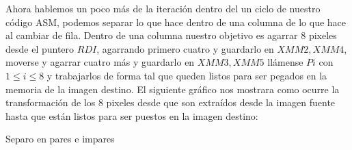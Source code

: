 Ahora hablemos un poco más de la iteración dentro del un ciclo de nuestro código ASM, podemos separar lo que hace dentro de una columna de lo que hace al cambiar de fila. Dentro de una columna nuestro objetivo es agarrar 8 pixeles desde el puntero $RDI$, agarrando primero cuatro y guardarlo en $XMM2, XMM4$, moverse y agarrar cuatro más y guardarlo en $XMM3, XMM5$ llámense $Pi$ con $1\leq i\leq 8$ y trabajarlos de forma tal que queden listos para ser pegados en la memoria de la imagen destino. El siguiente gráfico nos mostrara como ocurre la transformación de los 8 pixeles desde que son extraídos desde la imagen fuente hasta que están listos para ser puestos en la imagen destino: 

\begin{center}
\end{center}

Separo en pares e impares


